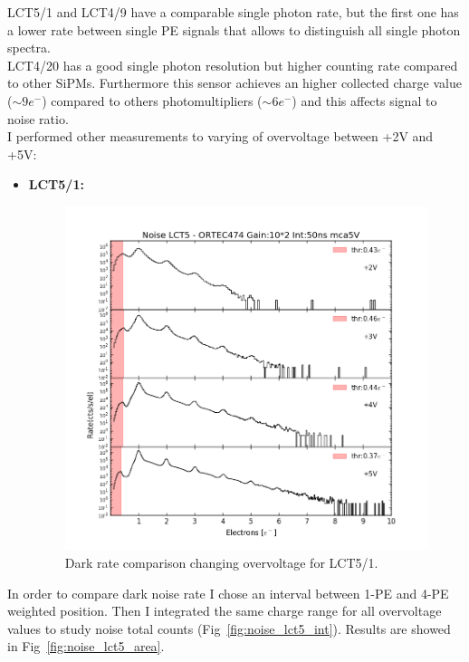 \documentclass[10pt,a4paper, openany]{book}
\begin{document}
LCT5/1 and LCT4/9 have a comparable single photon rate, but the first one has a lower rate between single PE signals that allows to distinguish all single photon spectra.\\
LCT4/20 has a good single photon resolution but higher counting rate compared to other SiPMs. Furthermore this sensor achieves an higher collected charge value ($\sim 9e^-$) compared to others photomultipliers ($\sim 6e^-$) and this affects signal to noise ratio.\\
I performed other measurements to varying of overvoltage between +2V and +5V:
\newpage
\begin{itemize}
\item \textbf{LCT5/1:}

\begin{figure}[!h]
\begin{center}
\includegraphics[scale=0.6]{imm/noise_lct5.png}
\end{center}
\caption{Dark rate comparison changing overvoltage for LCT5/1.} 
\label{fig:noise_lct5}
\end{figure}
\end{itemize}

In order to compare dark noise rate I chose an interval between 1-PE and 4-PE weighted position. Then I integrated the same charge range for all overvoltage values to study noise total counts (Fig~\ref{fig:noise_lct5_int}). Results are showed in Fig~\ref{fig:noise_lct5_area}.
\end{document}
